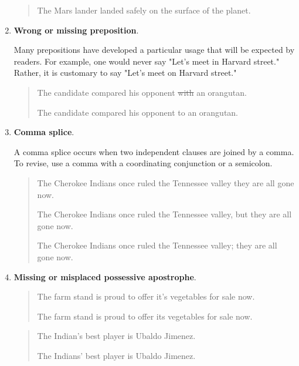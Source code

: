 \begin{enumerate}
\begin{quote}
The Mars lander landed safely on the surface of the planet.      
\end{quote}

\item \textbf{Wrong or missing preposition}.

Many prepositions have developed a particular usage that will be expected by readers. For example, one would never say "Let's meet in Harvard street." Rather, it is customary to say "Let's meet on Harvard street."
 
 \begin{quote}
The candidate compared his opponent \sout{with} an orangutan.      

The candidate compared his opponent to an orangutan.      
\end{quote}

\item \textbf{Comma splice}.

A comma splice occurs when two independent clauses are joined by a comma. To revise, use a comma with a coordinating conjunction or a semicolon.

\begin{quote}
The Cherokee Indians once ruled the Tennessee valley they are all gone now.      

The Cherokee Indians once ruled the Tennessee valley, but they are all gone now.      

The Cherokee Indians once ruled the Tennessee valley; they are all gone now.      
 
\end{quote}

\item \textbf{Missing or misplaced possessive apostrophe}. 

\begin{quote}
The farm stand is proud to offer it's vegetables for sale now.      

The farm stand is proud to offer its vegetables for sale now.      
\end{quote}

\begin{quote}

The Indian's best player is Ubaldo Jimenez.      

The Indians' best player is Ubaldo Jimenez.      
	
\end{quote}



\end{enumerate}
